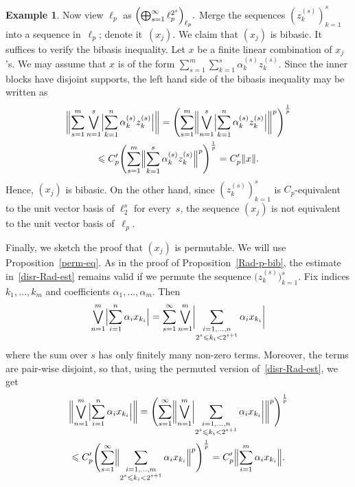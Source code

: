 \documentclass[12pt]{amsart}
\theoremstyle{plain}
\theoremstyle{definition}
\newtheorem{example}[theorem]{Example}
\newcommand{\norm}[1]{\lVert#1\rVert}
\newcommand{\Bigabs}[1]{\Bigl\lvert#1\Bigr\rvert}
\newcommand{\biggabs}[1]{\biggl\lvert#1\biggr\rvert}
\newcommand{\Bignorm}[1]{\Bigl\lVert#1\Bigr\rVert}
\newcommand{\biggnorm}[1]{\biggl\lVert#1\biggr\rVert}
\renewcommand{\le}{\leqslant}
\begin{document}
\begin{example}
  Now view $\ell_p$ as
  \begin{math}
    \Bigl(\bigoplus_{s=1}^\infty\ell_p^{2^s}\Bigr)_{\ell_p}.
  \end{math}
  Merge the sequences $(z^{(s)}_k)_{k=1}^s$ into a sequence
  in~$\ell_p$; denote it~$(x_j)$. We claim that $(x_j)$ is bibasic. It
  suffices to verify the bibasis inequality. Let $x$ be a finite
  linear combination of $x_j$'s. We may assume that $x$ is of the form
  \begin{math}
    \sum_{s=1}^m\sum_{k=1}^s\alpha^{(s)}_kz^{(s)}_k.    
  \end{math}
  Since the inner blocks have disjoint supports, the left hand side of
  the bibasis inequality may be written as
  \begin{multline*}
    \biggnorm{\sum_{s=1}^m\bigvee_{n=1}^s\Bigabs
      {\sum_{k=1}^n\alpha^{(s)}_kz^{(s)}_k}}
    =\Biggl(\sum_{s=1}^m\biggnorm{\bigvee_{n=1}^s\Bigabs
      {\sum_{k=1}^n\alpha^{(s)}_kz^{(s)}_k}}^p\Biggr)^{\frac{1}{p}}\\
     \le C_p'\Biggl(\sum_{s=1}^m\Bignorm{
       \sum_{k=1}^s\alpha^{(s)}_kz^{(s)}_k}^p\Biggr)^{\frac{1}{p}}
     =C_p'\norm{x}.
  \end{multline*}
  Hence, $(x_j)$ is bibasic. On the other hand, since
  $(z^{(s)}_k)_{k=1}^s$ is $C_p$-equivalent to the unit vector basis
  of $\ell_2^s$ for every~$s$, the sequence $(x_j)$ is not equivalent
  to the unit vector basis of~$\ell_p$.

  Finally, we sketch the proof that $(x_j)$ is permutable. We will use
  Proposition~\ref{perm-eq}. As in the proof of
  Proposition~\ref{Rad-p-bib}, the estimate in~\eqref{disr-Rad-est}
  remains valid if we permute the sequence
  $\bigl(z^{(s)}_k\bigr)_{k=1}^s$.  Fix indices $k_1,\dots,k_m$ and
  coefficients $\alpha_1,\dots,\alpha_m$. Then
  \begin{displaymath}
    \bigvee_{n=1}^m\Bigabs{\sum_{i=1}^n\alpha_ix_{k_i}}
    =\sum_{s=1}^\infty\bigvee_{n=1}^m\biggabs{
      \sum_{\substack{i=1,\dots,n\\2^s\le k_i<2^{s+1}}}\alpha_ix_{k_i}}
  \end{displaymath}
  where the sum over $s$ has only finitely many non-zero
  terms. Moreover, the terms are pair-wise disjoint, so that, using
  the permuted version of~\eqref{disr-Rad-est}, we get
  \begin{multline*}
    \biggnorm{\bigvee_{n=1}^m\Bigabs{\sum_{i=1}^n\alpha_ix_{k_i}}}
    =\Biggl(\sum_{s=1}^\infty\biggnorm{\bigvee_{n=1}^m\biggabs{
      \sum_{\substack{i=1,\dots,n\\2^s\le k_i<2^{s+1}}}\alpha_ix_{k_i}}}^p
    \Biggr)^{\frac{1}{p}}\\
    \le C_p'\Biggl(\sum_{s=1}^\infty\Bignorm{\sum_{\substack
        {i=1,\dots,m\\2^s\le k_i<2^{s+1}}}\alpha_ix_{k_i}}^p
    \Biggr)^{\frac1p}
    =C_p'\Bignorm{\sum_{i=1}^m\alpha_ix_{k_i}}.
  \end{multline*}
\end{example}
\end{document}
